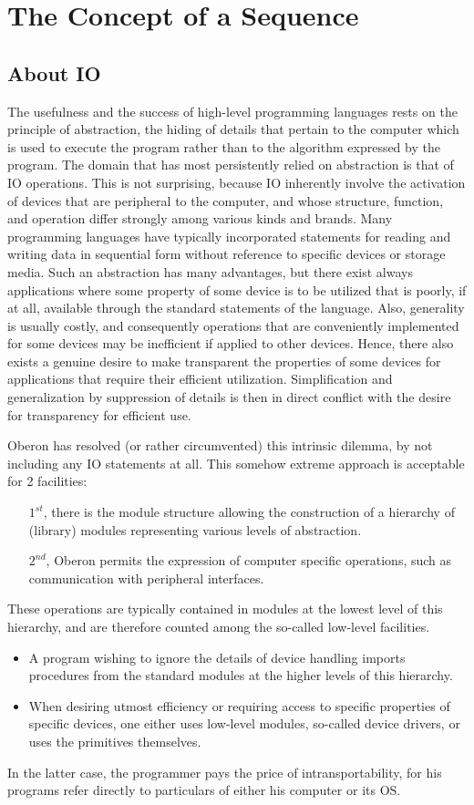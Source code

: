 \chapter{The Concept of a Sequence}\label{ch:seq}
\section{About IO}
The usefulness and the success of high-level programming languages rests on the principle
of abstraction, the hiding of details that pertain to the computer which is used to execute
the program rather than to the algorithm expressed by the program. The domain that has most
persistently relied on abstraction is that of IO operations. This is not
surprising, because IO inherently involve the activation of devices that are
peripheral to the computer, and whose structure, function, and operation differ strongly
among various kinds and brands. Many programming languages have typically incorporated
statements for reading and writing data in sequential form without reference to specific
devices or storage media. Such an abstraction has many advantages, but there exist always
applications where some property of some device is to be utilized that is poorly, if at all,
available through the standard statements of the language. Also, generality is usually
costly, and consequently operations that are conveniently implemented for some devices may
be inefficient if applied to other devices. Hence, there also exists a genuine desire to
make transparent the properties of some devices for applications that require their efficient
utilization. Simplification and generalization by suppression of details is then in direct
conflict with the desire for transparency for efficient use.

Oberon has resolved (or rather circumvented) this intrinsic dilemma, by not including any
IO statements at all. This somehow extreme approach is acceptable for 2 facilities:
\begin{itemize}
  \item[$1^{st}$,] there is the module structure allowing the construction of a hierarchy of
    (library) modules representing various levels of abstraction.
  \item[$2^{nd}$,] Oberon permits the expression of computer specific operations, such as
    communication with peripheral interfaces.
\end{itemize}
These operations are typically contained in modules at the lowest level of this hierarchy,
and are therefore counted among the so-called low-level facilities.
\begin{itemize}
  \item A program wishing to ignore the details of device handling imports procedures
    from the standard modules at the higher levels of this hierarchy.
  \item When desiring utmost efficiency or requiring access to specific properties of
    specific devices, one either uses low-level modules, so-called device drivers, or
    uses the primitives themselves.
\end{itemize}
In the latter case, the programmer pays the price of intransportability, for his programs
refer directly to particulars of either his computer or its OS.


